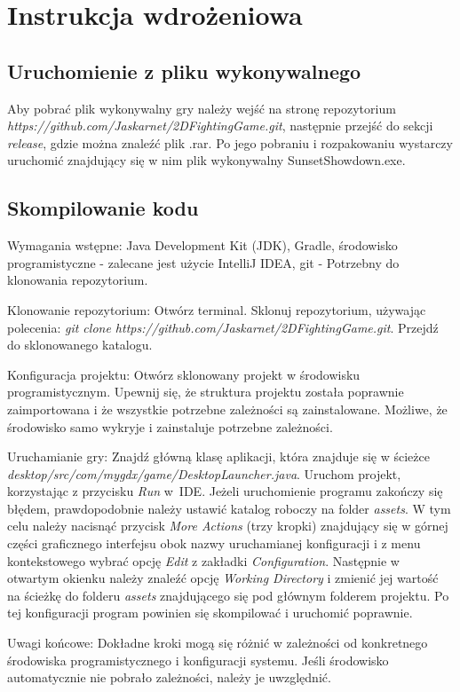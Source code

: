 \chapter{Instrukcja wdrożeniowa}
\section{Uruchomienie z pliku wykonywalnego}
Aby pobrać plik wykonywalny gry należy wejść na stronę repozytorium \emph{https://github.com/Jaskarnet/2DFightingGame.git}, następnie przejść do sekcji \emph{release}, gdzie można znaleźć plik .rar. Po jego pobraniu i rozpakowaniu wystarczy uruchomić znajdujący się w nim plik wykonywalny SunsetShowdown.exe.

\section{Skompilowanie kodu}
Wymagania wstępne:
Java Development Kit (JDK), Gradle, środowisko programistyczne - zalecane jest użycie IntelliJ IDEA, git - Potrzebny do klonowania repozytorium.

Klonowanie repozytorium: 
Otwórz terminal. Sklonuj repozytorium, używając polecenia: \emph{git clone https://github.com/Jaskarnet/2DFightingGame.git}. Przejdź do sklonowanego katalogu.

Konfiguracja projektu:
Otwórz sklonowany projekt w środowisku programistycznym. Upewnij się, że struktura projektu została poprawnie zaimportowana i że wszystkie potrzebne zależności są zainstalowane. Możliwe, że środowisko samo wykryje i zainstaluje potrzebne zależności.

Uruchamianie gry:
Znajdź główną klasę aplikacji, która znajduje się w ścieżce \emph{desktop/src/com/mygdx/game/DesktopLauncher.java}. Uruchom projekt, korzystając z przycisku \emph{Run} w~IDE. Jeżeli uruchomienie programu zakończy się błędem, prawdopodobnie należy ustawić katalog roboczy na folder \emph{assets}. W tym celu należy nacisnąć przycisk \emph{More Actions} (trzy kropki) znajdujący się w górnej części graficznego interfejsu obok nazwy uruchamianej konfiguracji i z menu kontekstowego wybrać opcję \emph{Edit} z zakładki \emph{Configuration}. Następnie w otwartym okienku należy znaleźć opcję \emph{Working Directory} i zmienić jej wartość na ścieżkę do folderu \emph{assets} znajdującego się pod głównym folderem projektu. Po tej konfiguracji program powinien się skompilować i uruchomić poprawnie.

Uwagi końcowe:
Dokładne kroki mogą się różnić w zależności od konkretnego środowiska programistycznego i konfiguracji systemu. Jeśli środowisko automatycznie nie pobrało zależności, należy je uwzględnić.